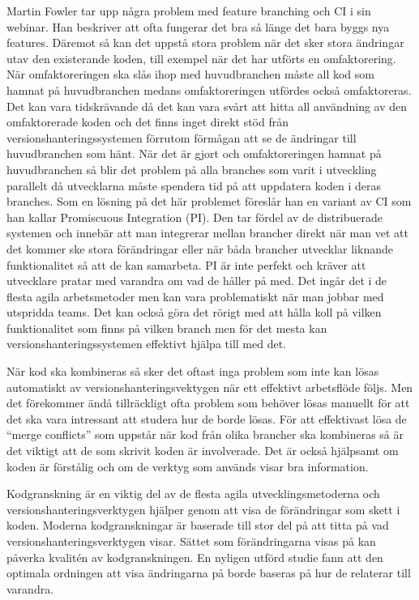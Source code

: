 Martin Fowler tar upp några problem med feature branching och CI i sin webinar. Han beskriver att ofta fungerar det bra så länge det bara byggs nya features. Däremot så kan det uppstå stora problem när det sker stora ändringar utav den existerande koden, till exempel när det har utförts en omfaktorering. När omfaktoreringen ska slås ihop med huvudbranchen måste all kod som hamnat på huvudbranchen medans omfaktoreringen utfördes också omfaktoreras. Det kan vara tidskrävande då det kan vara svårt att hitta all användning av den omfaktorerade koden och det finns inget direkt stöd från versionshanteringssystemen förrutom förmågan att se de ändringar till huvudbranchen som hänt. När det är gjort och omfaktoreringen hamnat på huvudbranchen så blir det problem på alla branches som varit i utveckling parallelt då utvecklarna måste spendera tid på att uppdatera koden i deras branches.
Som en lösning på det här problemet föreslår han en variant av CI som han kallar Promiscuous Integration (PI). Den tar fördel av de distribuerade systemen och innebär att man integrerar mellan brancher direkt när man vet att det kommer ske stora förändringar eller när båda brancher utvecklar liknande funktionalitet så att de kan samarbeta. PI är inte perfekt och kräver att utvecklare pratar med varandra om vad de håller på med. Det ingår det i de flesta agila arbetsmetoder men kan vara problematiskt när man jobbar med utspridda teams. Det kan också göra det rörigt med att hålla koll på vilken funktionalitet som finns på vilken branch men för det mesta kan versionshanteringssystemen effektivt hjälpa till med det.\cite{fowler-feature-branch}



När kod ska kombineras så sker det oftast inga problem som inte kan lösas automatiskt av versionshanteringsvektygen när ett effektivt arbetsflöde följs. Men det förekommer ändå tillräckligt ofta problem som behöver lösas manuellt för att det ska vara intressant att studera hur de borde lösas. För att effektivast lösa de ``merge conflicts'' som uppstår när kod från olika brancher ska kombineras så är det viktigt att de som skrivit koden är involverade. Det är också hjälpsamt om koden är förstålig och om de verktyg som används visar bra information.\cite{8094445}

Kodgranskning är en viktig del av de flesta agila utvecklingsmetoderna och versionshanteringsverktygen hjälper genom att visa de förändringar som skett i koden. Moderna kodgranskningar är baserade till stor del på att titta på vad versionshanteringsverktygen visar. Sättet som förändringarna visas på kan påverka kvalitén av kodgranskningen. En nyligen utförd studie fann att den optimala ordningen att visa ändringarna på borde baseras på hur de relaterar till varandra.\cite{8094433}